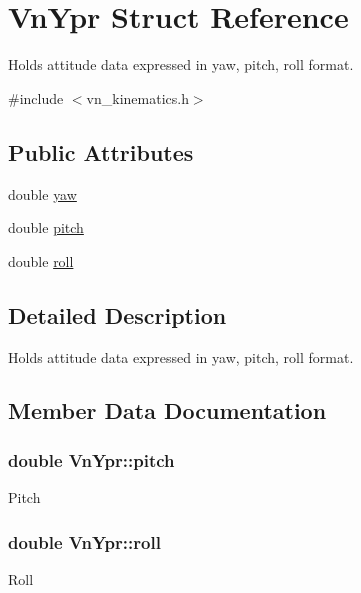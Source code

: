 \hypertarget{structVnYpr}{}\section{Vn\+Ypr Struct Reference}
\label{structVnYpr}


Holds attitude data expressed in yaw, pitch, roll format.  




{\ttfamily \#include $<$vn\+\_\+kinematics.\+h$>$}

\subsection*{Public Attributes}
\begin{DoxyCompactItemize}
\item 
double \hyperlink{structVnYpr_a1b600c94305ce2ce8a997a36f0e704af}{yaw}
\item 
double \hyperlink{structVnYpr_a724b1aa0c2dc4ae3efb06af9c2e18d65}{pitch}
\item 
double \hyperlink{structVnYpr_a1b58779eb064162939ab0dcea41481f3}{roll}
\end{DoxyCompactItemize}


\subsection{Detailed Description}
Holds attitude data expressed in yaw, pitch, roll format. 

\subsection{Member Data Documentation}
\subsubsection[{\texorpdfstring{pitch}{pitch}}]{\setlength{\rightskip}{0pt plus 5cm}double Vn\+Ypr\+::pitch}\hypertarget{structVnYpr_a724b1aa0c2dc4ae3efb06af9c2e18d65}{}\label{structVnYpr_a724b1aa0c2dc4ae3efb06af9c2e18d65}
Pitch 
\subsubsection[{\texorpdfstring{roll}{roll}}]{\setlength{\rightskip}{0pt plus 5cm}double Vn\+Ypr\+::roll}\hypertarget{structVnYpr_a1b58779eb064162939ab0dcea41481f3}{}\label{structVnYpr_a1b58779eb064162939ab0dcea41481f3}
Roll 
